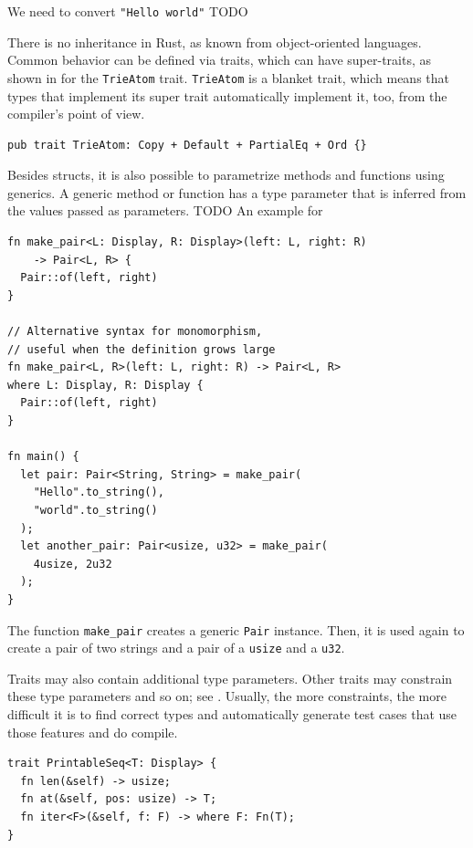 \documentclass[paper=a4,%
  twoside,%
  BCOR4mm,%
  abstract=true,%
  toc=bibliography,%
  chapterprefix=true,%
  toc=bibliographynumbered,%
  open=right,%
  english,%
  pagesize=pdftex]{scrreprt}
\begin{document}
We need to convert \texttt{"Hello world"} TODO

There is no inheritance in Rust, as known from object-oriented languages. Common behavior can be defined via traits, which can have super-traits, as shown in  for the \texttt{TrieAtom} trait. \texttt{TrieAtom} is a blanket trait, which means that types that implement its super trait automatically implement it, too, from the compiler's point of view.
\begin{lstlisting}[style=boxed, caption={An example trait from the \emph{trying} crate which we evaluate the approach on}, label=lst:trying-supertraits]
pub trait TrieAtom: Copy + Default + PartialEq + Ord {}
\end{lstlisting}

Besides structs, it is also possible to parametrize methods and functions using generics. A generic method or function has a type parameter that is inferred from the values passed as parameters. TODO An example for
\begin{lstlisting}[style=boxed, caption={Variants of defining a generic function}, label=lst:function-monomorphization]
fn make_pair<L: Display, R: Display>(left: L, right: R)
    -> Pair<L, R> {
  Pair::of(left, right)
}

// Alternative syntax for monomorphism,
// useful when the definition grows large
fn make_pair<L, R>(left: L, right: R) -> Pair<L, R>
where L: Display, R: Display {
  Pair::of(left, right)
}

fn main() {
  let pair: Pair<String, String> = make_pair(
    "Hello".to_string(),
    "world".to_string()
  );
  let another_pair: Pair<usize, u32> = make_pair(
    4usize, 2u32
  );
}
\end{lstlisting}

The function \texttt{make\string_pair} creates a generic \texttt{Pair} instance. Then, it is used again to create a pair of two strings and a pair of a \texttt{usize} and a \texttt{u32}.

Traits may also contain additional type parameters. Other traits may constrain these type parameters and so on; see . Usually, the more constraints, the more difficult it is to find correct types and automatically generate test cases that use those features and do compile.

\begin{lstlisting}[style=boxed, caption={Type parameters can be specified for a trait to make it generic. These appear after the trait name, using the same syntax used in generic functions}, label=lst:traits-with-type-bounds]
trait PrintableSeq<T: Display> {
  fn len(&self) -> usize;
  fn at(&self, pos: usize) -> T;
  fn iter<F>(&self, f: F) -> where F: Fn(T);
}
\end{lstlisting}
\end{document}
